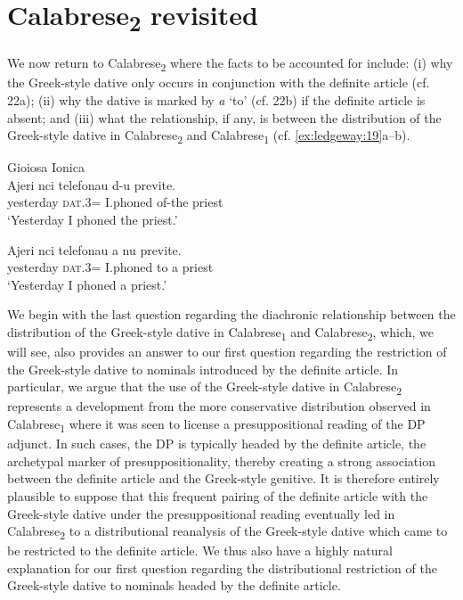 \documentclass[output=paper,modfonts,nonflat,colorlinks,citecolor=brown]{langsci/langscibook}
\begin{document}
\section{Calabrese\textsubscript{2} revisited}

We now return to Calabrese\textsubscript{2} where the facts to be accounted for include: (i) why the Greek-style dative only occurs in conjunction with the definite article (cf. 22a); (ii) why the dative is marked by \textit{a} ‘to’ (cf. 22b) if the definite article is absent; and (iii) what the relationship, if any, is between the distribution of the Greek-style dative in Calabrese\textsubscript{2} and Calabrese\textsubscript{1} (cf. \ref{ex:ledgeway:19}a--b). 

\ea\label{ex:ledgeway:22}
  Gioiosa Ionica\\
\ea  \gll Ajeri  nci  telefonau  d-u  previte.\\
    yesterday  \textsc{dat}.3=  I.phoned  of-the  priest\\
    \glt `Yesterday I phoned the priest.'

\ex
	\gll Ajeri  nci  telefonau  a   nu   previte.\\
      yesterday  \textsc{dat}.3=  I.phoned   to   a  priest \\
      \glt `Yesterday I phoned a priest.'
      \z
      \z

  We begin with the last question regarding the diachronic relationship between the distribution of the Greek-style dative in Calabrese\textsubscript{1} and Calabrese\textsubscript{2}, which, we will see, also provides an answer to our first question regarding the restriction of the Greek-style dative to nominals introduced by the definite article. In particular, we argue that the use of the Greek-style dative in Calabrese\textsc{\textsubscript{2}} represents a development from the more conservative distribution observed in Calabrese\textsubscript{1} where it was seen to license a presuppositional reading of the DP adjunct. In such cases, the DP is typically headed by the definite article, the archetypal marker of presuppositionality, thereby creating a strong association between the definite article and the Greek-style genitive. It is therefore entirely plausible to suppose that this frequent pairing of the definite article with the Greek-style dative under the presuppositional reading eventually led in Calabrese\textsubscript{2} to a distributional reanalysis of the Greek-style dative which came to be restricted to the definite article. We thus also have a highly natural explanation for our first question regarding the distributional restriction of the Greek-style dative to nominals headed by the definite article. 
\end{document}
